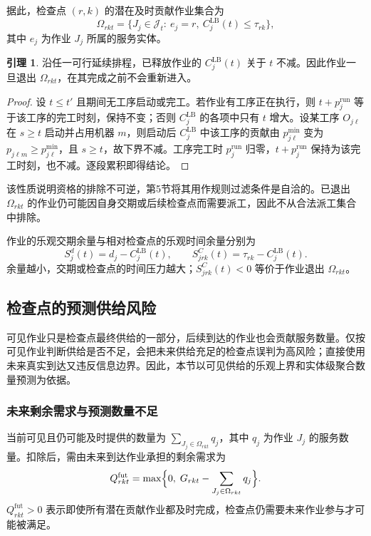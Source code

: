 \documentclass[12pt,a4paper]{article}
\theoremstyle{definition}
\newtheorem{lemma}{引理}
\newcommand{\cJ}{\mathcal{J}}
\begin{document}
据此，检查点 $(r,k)$ 的潜在及时贡献作业集合为
\begin{equation}\label{eq:omega}
  \Omega_{rkt}=\{J_j\in\cJ_t:\ e_j=r,\ C^{\mathrm{LB}}_j(t)\le\tau_{rk}\},
\end{equation}
其中 $e_j$ 为作业 $J_j$ 所属的服务实体。

\begin{lemma}\label{lem:mono}
沿任一可行延续排程，已释放作业的 $C^{\mathrm{LB}}_j(t)$ 关于 $t$ 不减。因此作业一旦退出 $\Omega_{rkt}$，在其完成之前不会重新进入。
\end{lemma}
\begin{proof}
设 $t\le t'$ 且期间无工序启动或完工。若作业有工序正在执行，则 $t+p^{\mathrm{run}}_j$ 等于该工序的完工时刻，保持不变；否则 $C^{\mathrm{LB}}_j$ 的各项中只有 $t$ 增大。设某工序 $O_{j\ell}$ 在 $s\ge t$ 启动并占用机器 $m$，则启动后 $C^{\mathrm{LB}}_j$ 中该工序的贡献由 $p^{\min}_{j\ell}$ 变为 $p_{j\ell m}\ge p^{\min}_{j\ell}$，且 $s\ge t$，故下界不减。工序完工时 $p^{\mathrm{run}}_j$ 归零，$t+p^{\mathrm{run}}_j$ 保持为该完工时刻，也不减。逐段累积即得结论。
\end{proof}
该性质说明资格的排除不可逆，第5节将其用作规则过滤条件是自洽的。已退出 $\Omega_{rkt}$ 的作业仍可能因自身交期或后续检查点而需要派工，因此不从合法派工集合中排除。

作业的乐观交期余量与相对检查点的乐观时间余量分别为
\begin{equation}\label{eq:slack}
  S^{d}_j(t)=d_j-C^{\mathrm{LB}}_j(t),\qquad S^{C}_{jrk}(t)=\tau_{rk}-C^{\mathrm{LB}}_j(t).
\end{equation}
余量越小，交期或检查点的时间压力越大；$S^{C}_{jrk}(t)<0$ 等价于作业退出 $\Omega_{rkt}$。

\subsection{检查点的预测供给风险}

可见作业只是检查点最终供给的一部分，后续到达的作业也会贡献服务数量。仅按可见作业判断供给是否不足，会把未来供给充足的检查点误判为高风险；直接使用未来真实到达又违反信息边界。因此，本节以可见供给的乐观上界和实体级聚合数量预测为依据。

\subsubsection{未来剩余需求与预测数量不足}

当前可见且仍可能及时提供的数量为 $\sum_{J_j\in\Omega_{rkt}}q_j$，其中 $q_j$ 为作业 $J_j$ 的服务数量。扣除后，需由未来到达作业承担的剩余需求为
\begin{equation}\label{eq:qfut}
  Q^{\mathrm{fut}}_{rkt}=\max\Bigl\{0,\;G_{rkt}-\sum_{J_j\in\Omega_{rkt}}q_j\Bigr\}.
\end{equation}
$Q^{\mathrm{fut}}_{rkt}>0$ 表示即使所有潜在贡献作业都及时完成，检查点仍需要未来作业参与才可能被满足。
\end{document}
